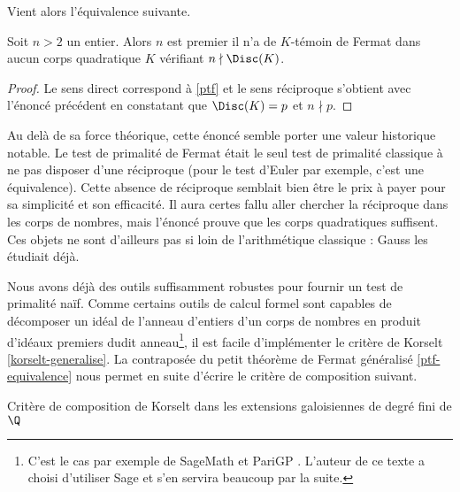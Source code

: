Vient alors l'équivalence suivante.

\begin{theoreme}\label{ptf-equivalence}
	Soit $n>2$ un entier. Alors $n$ est premier \ssi il n'a de $K$-témoin de Fermat dans aucun corps quadratique $K$ vérifiant $n\nmid \Disc(K)$.
\end{theoreme}

\begin{proof}
	Le sens direct correspond à \ref{ptf} et le sens réciproque s'obtient avec l'énoncé précédent en constatant que $\Disc(K) = p$ et $n\nmid p$.
\end{proof}

\begin{remarque}
Au delà de sa force théorique, cette énoncé semble porter une valeur historique notable. Le test de primalité de Fermat était le seul test de primalité classique à ne pas disposer d'une réciproque (pour le test d'Euler par exemple, c'est une équivalence). Cette absence de réciproque semblait bien être le prix à payer pour sa simplicité et son efficacité. Il aura certes fallu aller chercher la réciproque dans les corps de nombres, mais l'énoncé prouve que les corps quadratiques suffisent. Ces objets ne sont d'ailleurs pas si loin de l'arithmétique classique : Gauss les étudiait déjà.
\end{remarque}

Nous avons déjà des outils suffisamment robustes pour fournir un test de primalité naïf. Comme certains outils de calcul formel sont capables de décomposer un idéal de l'anneau d'entiers d'un corps de nombres en produit d'idéaux premiers dudit anneau\footnote{C'est le cas par exemple de SageMath et PariGP . L'auteur de ce texte a choisi d'utiliser Sage et s'en servira beaucoup par la suite.}, il est facile d'implémenter le critère de Korselt \ref{korselt-generalise}. La contraposée du petit théorème de Fermat généralisé \ref{ptf-equivalence} nous permet en suite d'écrire le critère de composition suivant.

\vspace{1em}
\begin{algorithm}[H]\label{test-primalite-korselt}
\caption{Critère de composition de Korselt dans les extensions galoisiennes de degré fini de $\Q$}
\end{algorithm}
\vspace{1em}


